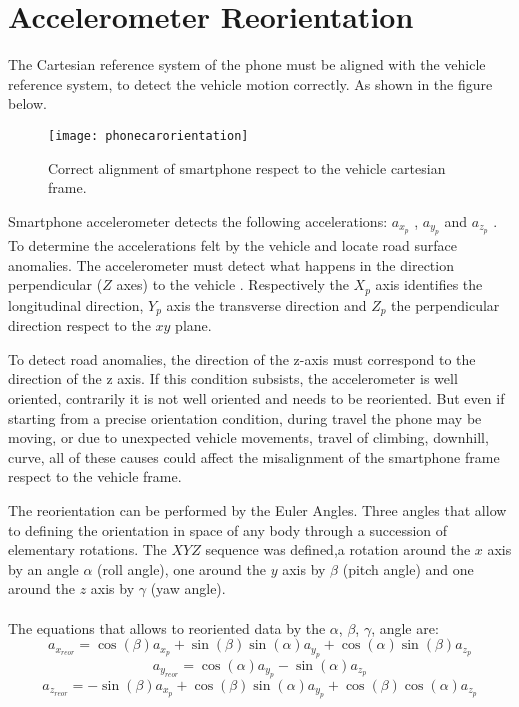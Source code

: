 \documentclass[tesi]{subfiles}
\begin{document}
\section{Accelerometer Reorientation} \label{sc:Accelerometer Reorientation}
\noindent The Cartesian reference system of the phone must be aligned with the vehicle reference system, to detect the vehicle motion correctly.
As shown in the figure below.

\begin{figure}[ht]
  \centering
  \texttt{[image: phonecarorientation]}  
  \caption{Correct alignment of smartphone respect to the vehicle cartesian frame.}
  \label{fig:Smartphone cartesian frame alignment respect Car axis.}
\end{figure}
\noindent Smartphone accelerometer detects the following accelerations: $a_{x_{p}}$ , $a_{y_{p}}$ and $a_{z_{p}}$ . To determine the accelerations felt by the vehicle and locate road surface anomalies. The accelerometer must detect what happens in the direction perpendicular ($Z$ axes) to the vehicle \cite{mohan2008nericell}.
Respectively the $X_{p}$ axis identifies the longitudinal direction, $Y_{p}$ axis the transverse direction and $Z_{p}$ the perpendicular direction respect to the $xy$ plane.

\noindent To detect road anomalies, the direction of the z-axis must correspond to the direction of the z axis. If this condition subsists, the accelerometer is well oriented, contrarily it is not well oriented and needs to be reoriented. But even if starting from a precise orientation condition, during travel the phone may be moving, or due to unexpected vehicle movements, travel of climbing, downhill, curve, all of these causes could affect the misalignment of the smartphone frame respect to the vehicle frame.

\noindent The reorientation can be performed by the Euler Angles. Three angles that allow to defining the orientation in space of any body through a succession of elementary rotations.\cite{diebel2006representing}
The $XYZ$ sequence was defined,a rotation around the $x$ axis by an angle $\alpha$ (roll angle), one around the $y$ axis by $\beta$ (pitch angle) and one around the $z$ axis by  $\gamma$ (yaw angle).\\\\
\noindent The equations that allows to reoriented data by the $\alpha$, $\beta$, $\gamma$, angle are:\cite{Andro}
\begin{equation}
a_{x_{reor}} = \cos (\beta) a_{x_{p}} + \sin (\beta) \sin (\alpha) a_{y_{p}} + \cos (\alpha) \sin (\beta) a_{z_{p}} 
\end{equation}
\begin{equation}
a_{y_{reor}} = \cos (\alpha) a_{y_{p}} - \sin (\alpha) a_{z_{p}}
\end{equation}
\begin{equation}
a_{z_{reor}} = -\sin (\beta) a_{x_{p}} + \cos (\beta) \sin (\alpha) a_{y_{p}} + \cos (\beta) \cos (\alpha) a_{z_{p}}
\end{equation}
\end{document}
